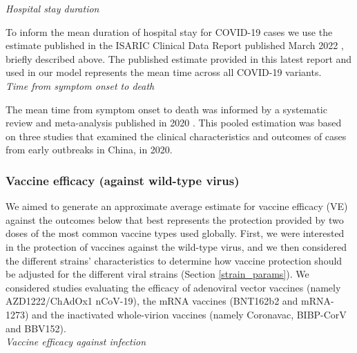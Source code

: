 \textit{Hospital stay duration}

To inform the mean duration of hospital stay for COVID-19 cases we use the estimate published in the ISARIC Clinical Data Report published March 2022 \cite{isaric2022}, briefly described above. 
The published estimate provided in this latest report and used in our model represents the mean time across all COVID-19 
variants.\\

\textit{Time from symptom onset to death}

The mean time from symptom onset to death was informed by a systematic review and meta-analysis published in 2020 \cite{khalili2020}. This pooled estimation was based on three studies 
that examined the clinical characteristics and outcomes of cases from early outbreaks in China, in 2020.


\subsubsection{Vaccine efficacy (against wild-type virus)}
\label{vacc_params}
We aimed to generate an approximate average estimate for vaccine efficacy (VE) against the outcomes below that best represents 
the protection provided by two doses of the most common vaccine types used globally. First, we were interested in the protection 
of vaccines against the wild-type virus, and we then considered the different strains' characteristics
to determine how vaccine protection should be adjusted for the different viral strains (Section \ref{strain_params}). 
We considered studies evaluating the efficacy of adenoviral vector vaccines (namely AZD1222/ChAdOx1 nCoV-19), the mRNA vaccines (BNT162b2 and mRNA-1273) and the 
inactivated whole-virion vaccines (namely Coronavac, BIBP-CorV and BBV152).\\

\textit{Vaccine efficacy against infection}

